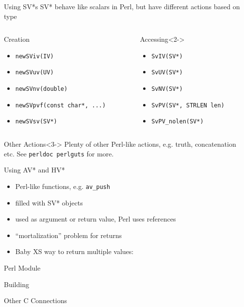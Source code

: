 \documentclass{beamer}
\begin{document}
\begin{frame}[fragile]{Using SV*s}
  SV* behave like scalars in Perl, but have different actions based on type
  \begin{columns}
    \begin{column}{0.54\linewidth}
      \begin{block}{Creation}
        \begin{itemize}
          \item \verb!newSViv(IV)!
          \item \verb!newSVuv(UV)!
          \item \verb!newSVnv(double)!
          \item \verb!newSVpvf(const char*, ...)!
          \item \verb!newSVsv(SV*)!
        \end{itemize}
      \end{block}
    \end{column}
    \begin{column}{0.44\linewidth}
      \begin{block}{Accessing}<2->
        \begin{itemize}
          \item \verb!SvIV(SV*)!
          \item \verb!SvUV(SV*)!
          \item \verb!SvNV(SV*)!
          \item \verb!SvPV(SV*, STRLEN len)!
          \item \verb!SvPV_nolen(SV*)!
        \end{itemize}
      \end{block}
    \end{column}
  \end{columns}
  \begin{block}{Other Actions}<3->
    Plenty of other Perl-like actions, e.g. truth, concatenation etc. See \verb!perldoc perlguts! for more.
  \end{block}
\end{frame}

\begin{frame}[fragile]{Using AV* and HV*}
  \begin{itemize}
    \item Perl-like functions, e.g. \verb!av_push!
    \item filled with SV* objects
    \item used as argument or return value, Perl uses references
    \item ``mortalization'' problem for returns
    \item Baby XS way to return multiple values:
  \end{itemize}
  \vfill
  \begin{block}{}
    \scriptsize
    
  \end{block}
\end{frame}

\begin{frame}{Perl Module}

\end{frame}

\begin{frame}{Building}

\end{frame}

\begin{frame}{Other C Connections}

\end{frame}
\end{document}
